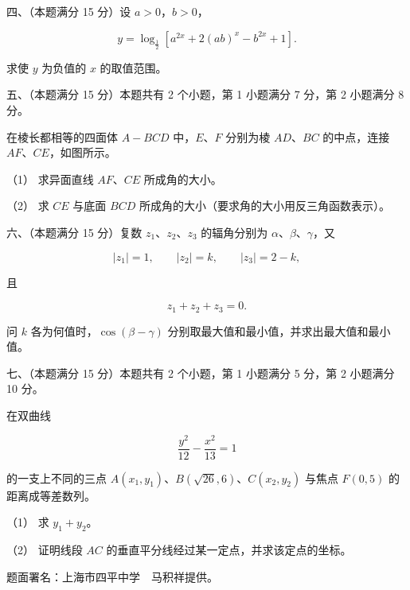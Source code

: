 \begin{question}

四、（本题满分 15 分）设 $a>0$，$b>0$，

\nopagebreak[4]
\[
y=\log_{\frac12}\left[a^{2x}+2(ab)^x-b^{2x}+1\right].
\]

求使 $y$ 为负值的 $x$ 的取值范围。

\Needspace{0.4\textheight}
\end{question}
\begin{question}

五、（本题满分 15 分）本题共有 2 个小题，第 1 小题满分 7 分，第 2 小题满分 8 分。

在棱长都相等的四面体 $A-BCD$ 中，$E\text{、}F$ 分别为棱 $AD\text{、}BC$ 的中点，连接 $AF\text{、}CE$，如图所示。
\nopagebreak[4]
\begin{center}\end{center}
\nopagebreak[4]
（1） 求异面直线 $AF\text{、}CE$ 所成角的大小。

（2） 求 $CE$ 与底面 $BCD$ 所成角的大小（要求角的大小用反三角函数表示）。

\end{question}
\begin{question}

六、（本题满分 15 分）复数 $z_1\text{、}z_2\text{、}z_3$ 的辐角分别为 $\alpha\text{、}\beta\text{、}\gamma$，又

\nopagebreak[4]
\[
|z_1|=1,\qquad |z_2|=k,\qquad |z_3|=2-k,
\]

且

\nopagebreak[4]
\[
z_1+z_2+z_3=0.
\]

问 $k$ 各为何值时，$\cos(\beta-\gamma)$ 分别取最大值和最小值，并求出最大值和最小值。

\end{question}
\begin{question}

七、（本题满分 15 分）本题共有 2 个小题，第 1 小题满分 5 分，第 2 小题满分 10 分。

在双曲线

\nopagebreak[4]
\[
\frac{y^2}{12}-\frac{x^2}{13}=1
\]

的一支上不同的三点 $A(x_1,y_1)$、$B(\sqrt{26},6)$、$C(x_2,y_2)$ 与焦点 $F(0,5)$ 的距离成等差数列。

（1） 求 $y_1+y_2$。

（2） 证明线段 $AC$ 的垂直平分线经过某一定点，并求该定点的坐标。

\begin{gktip}
题面署名：上海市四平中学　马积祥提供。
\end{gktip}

\end{question}